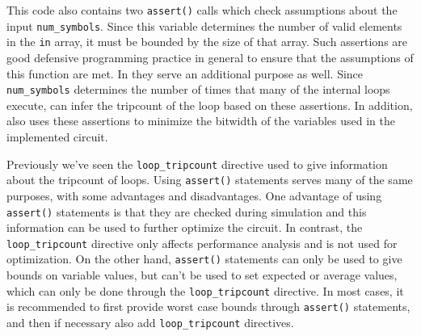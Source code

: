 This code also contains two \lstinline{assert()} calls which check assumptions about the input \lstinline{num_symbols}.  Since this variable determines the number of valid elements in the \lstinline{in} array, it must be bounded by the size of that array.  Such assertions are good defensive programming practice in general to ensure that the assumptions of this function are met.  In \VHLS they serve an additional purpose as well.  Since \lstinline{num_symbols} determines the number of times that many of the internal loops execute, \VHLS can infer the tripcount of the loop based on these assertions.  In addition, \VHLS also uses these assertions to minimize the bitwidth of the variables used in the implemented circuit.

\begin{aside}
Previously we've seen the \lstinline{loop_tripcount} directive used to give \VHLS information about the tripcount of loops.   Using \lstinline{assert()} statements serves many of the same purposes, with some advantages and disadvantages.  One advantage of using \lstinline{assert()} statements is that they are checked during simulation and this information can be used to further optimize the circuit.  In contrast, the \lstinline{loop_tripcount} directive only affects performance analysis and is not used for optimization.  On the other hand, \lstinline{assert()} statements can only be used to give bounds on variable values, but can't be used to set expected or average values, which can only be done through the \lstinline{loop_tripcount} directive.  In most cases, it is recommended to first provide worst case bounds through \lstinline{assert()} statements, and then if necessary also add \lstinline{loop_tripcount} directives.
\end{aside}

